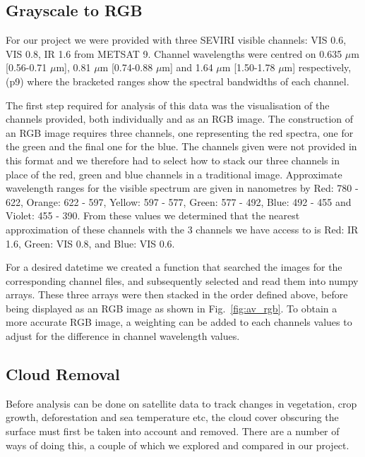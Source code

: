\subsection{Grayscale to RGB}
For our project we were provided with three SEVIRI visible channels: VIS 0.6, VIS 0.8, IR 1.6 %
from METSAT 9. Channel wavelengths were centred on 0.635 $\mu$m [0.56-0.71 $\mu$m], 0.81 $\mu$m [0.74-0.88 $\mu$m] and 1.64 $\mu$m [1.50-1.78 $\mu$m] respectively, (p9) where the bracketed ranges show the spectral bandwidths of each channel. 
\par The first step required for analysis of this data was the visualisation of the channels provided, both individually and as an RGB image. The construction of an RGB image requires three channels, one representing the red spectra, one for the green and the final one for the blue. The channels given were not provided in this format and we therefore had to select how to stack our three channels in place of the red, green and blue channels in a traditional image. Approximate wavelength ranges for the visible spectrum are given in nanometres by Red: 780 - 622, Orange: 622 - 597, Yellow: 597 - 577, Green: 577 - 492, Blue: 492 - 455 and Violet: 455 - 390. %
From these values we determined that the nearest approximation of these channels with the 3 channels we have access to is Red: IR 1.6, Green: VIS 0.8, and Blue: VIS 0.6. 
\par For a desired datetime we created a function that searched the images for the corresponding channel files, and subsequently selected and read them into numpy arrays. These three arrays were then stacked in the order defined above, before being displayed as an RGB image as shown in Fig.~\ref{fig:av_rgb}. To obtain a more accurate RGB image, a weighting can be added to each channels values to adjust for the difference in channel wavelength values. 
\subsection{Cloud Removal}
 Before analysis can be done on satellite data to track changes in vegetation, crop growth, deforestation and sea temperature etc, the cloud cover obscuring the surface must first be taken into account and removed. There are a number of ways of doing this, a couple of which we explored and compared in our project. 
